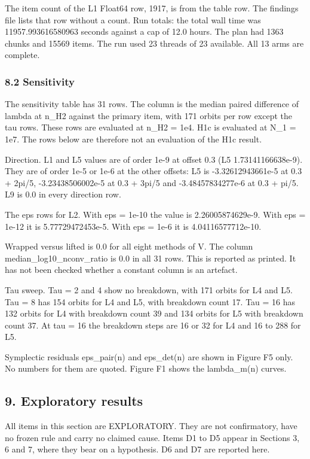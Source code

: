 \documentclass[
  11pt,
]{article}
\begin{document}
The item count of the L1 Float64 row, 1917, is from the table row. The
findings file lists that row without a count. Run totals: the total wall
time was 11957.993616580963 seconds against a cap of 12.0 hours. The
plan had 1363 chunks and 15569 items. The run used 23 threads of 23
available. All 13 arms are complete.

\subsubsection{8.2 Sensitivity}\label{sensitivity}

The sensitivity table has 31 rows. The column is the median paired
difference of lambda at n\_H2 against the primary item, with 171 orbits
per row except the tau rows. These rows are evaluated at n\_H2 = 1e4.
H1c is evaluated at N\_1 = 1e7. The rows below are therefore not an
evaluation of the H1c result.

Direction. L1 and L5 values are of order 1e-9 at offset 0.3 (L5
1.73141166638e-9). They are of order 1e-5 or 1e-6 at the other offsets:
L5 is -3.32612943661e-5 at 0.3 + 2pi/5, -3.23438506002e-5 at 0.3 + 3pi/5
and -3.48457834277e-6 at 0.3 + pi/5. L9 is 0.0 in every direction row.

The eps rows for L2. With eps = 1e-10 the value is 2.26005874629e-9.
With eps = 1e-12 it is 5.77729472453e-5. With eps = 1e-6 it is
4.04116577712e-10.

Wrapped versus lifted is 0.0 for all eight methods of V. The column
median\_log10\_nconv\_ratio is 0.0 in all 31 rows. This is reported as
printed. It has not been checked whether a constant column is an
artefact.

Tau sweep. Tau = 2 and 4 show no breakdown, with 171 orbits for L4 and
L5. Tau = 8 has 154 orbits for L4 and L5, with breakdown count 17. Tau =
16 has 132 orbits for L4 with breakdown count 39 and 134 orbits for L5
with breakdown count 37. At tau = 16 the breakdown steps are 16 or 32
for L4 and 16 to 288 for L5.

Symplectic residuals eps\_pair(n) and eps\_det(n) are shown in Figure F5
only. No numbers for them are quoted. Figure F1 shows the lambda\_m(n)
curves.

\subsection{9. Exploratory results}\label{exploratory-results}

All items in this section are EXPLORATORY. They are not confirmatory,
have no frozen rule and carry no claimed cause. Items D1 to D5 appear in
Sections 3, 6 and 7, where they bear on a hypothesis. D6 and D7 are
reported here.
\end{document}
